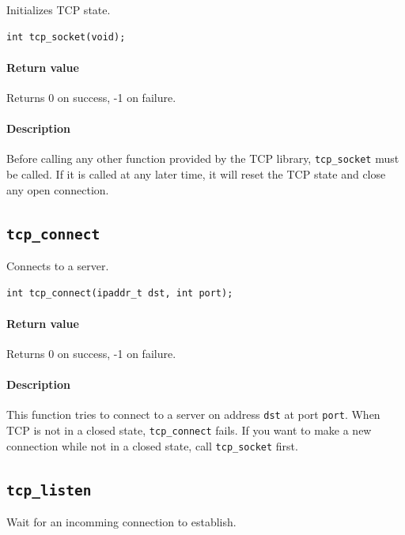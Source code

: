 \documentclass[11pt]{article}
\begin{document}
Initializes TCP state.

\begin{lstlisting}
int tcp_socket(void);
\end{lstlisting}

\paragraph{Return value}

Returns 0 on success, -1 on failure.

\paragraph{Description}

Before calling any other function provided by the TCP library,
\lstinline|tcp_socket| must be called. If it is called at any later time, it
will reset the TCP state and close any open connection.


\subsection{\lstinline{tcp_connect}}

Connects to a server.

\begin{lstlisting}
int tcp_connect(ipaddr_t dst, int port);
\end{lstlisting}

\paragraph{Return value}

Returns 0 on success, -1 on failure.

\paragraph{Description}

This function tries to connect to a server on address \lstinline|dst| at port
\lstinline|port|. When TCP is not in a closed state, \lstinline|tcp_connect|
fails. If you want to make a new connection while not in a closed state, call
\lstinline|tcp_socket| first.


\subsection{\lstinline{tcp_listen}}

Wait for an incomming connection to establish.
\end{document}
